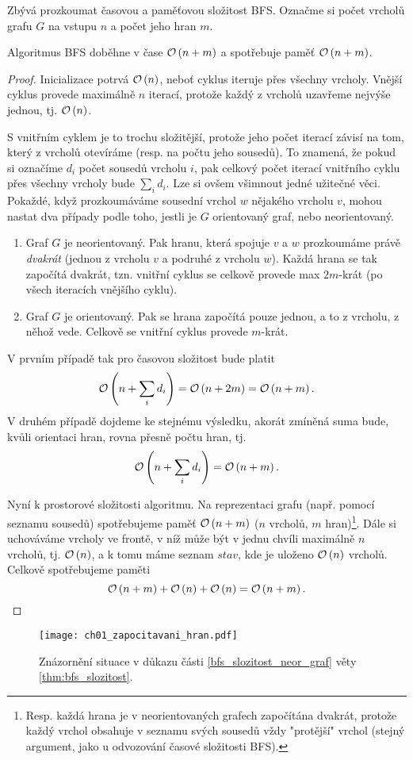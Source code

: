 Zbývá prozkoumat časovou a paměťovou složitost BFS. Označme si počet vrcholů grafu $G$ na vstupu $n$ a počet jeho hran $m$. 
\begin{theorem}\label{thm:bfs_slozitost}
    Algoritmus BFS doběhne v čase $\mathcal{O}\left(n+m\right)$ a spotřebuje paměť $\mathcal{O}\left(n+m\right)$.
\end{theorem}
\begin{proof}
    Inicializace potrvá $\mathcal{O}\left(n\right)$, neboť cyklus iteruje přes všechny vrcholy. Vnější cyklus provede maximálně $n$ iterací, protože každý z vrcholů uzavřeme nejvýše jednou, tj. $\mathcal{O}\left(n\right)$.

    S vnitřním cyklem je to trochu složitější, protože jeho počet iterací závisí na tom, který z vrcholů otevíráme (resp. na počtu jeho sousedů). To znamená, že pokud si označíme $d_i$ počet sousedů vrcholu $i$, pak celkový počet iterací vnitřního cyklu přes všechny vrcholy bude $\sum_i{d_i}$. Lze si ovšem všimnout jedné užitečné věci. Pokaždé, když prozkoumáváme sousední vrchol $w$ nějakého vrcholu $v$, mohou nastat dva případy podle toho, jestli je $G$ orientovaný graf, nebo neorientovaný.
    \begin{enumerate}[label=(\roman*)]
        \item\label{bfs_slozitost_neor_graf} Graf $G$ je neorientovaný. Pak hranu, která spojuje $v$ a $w$ prozkoumáme právě \emph{dvakrát} (jednou z vrcholu $v$ a podruhé z vrcholu $w$). Každá hrana se tak započítá dvakrát, tzn. vnitřní cyklus se celkově provede max $2m$-krát (po všech iteracích vnějšího cyklu).
        \item\label{bfs_slozitost_or_graf} Graf $G$ je orientovaný. Pak se hrana započítá pouze jednou, a to z vrcholu, z něhož vede. Celkově se vnitřní cyklus provede $m$-krát.
    \end{enumerate}
    V prvním případě tak pro časovou složitost bude platit
    \[\mathcal{O}\left(n+\sum_i{d_i}\right)=\mathcal{O}\left(n+2m\right)=\mathcal{O}\left(n+m\right).\]
    V druhém případě dojdeme ke stejnému výsledku, akorát zmíněná suma bude, kvůli orientaci hran, rovna přesně počtu hran, tj.
    \[\mathcal{O}\left(n+\sum_i{d_i}\right)=\mathcal{O}\left(n+m\right).\]

    Nyní k prostorové složitosti algoritmu. Na reprezentaci grafu (např. pomocí seznamu sousedů) spotřebujeme paměť $\mathcal{O}\left(n+m\right)$ ($n$ vrcholů, $m$ hran)\footnote{Resp. každá hrana je v neorientovaných grafech započítána dvakrát, protože každý vrchol obsahuje v seznamu svých sousedů vždy "protější" vrchol (stejný argument, jako u odvozování časové složitosti BFS).}. Dále si uchováváme vrcholy ve frontě, v níž může být v jednu chvíli maximálně $n$ vrcholů, tj. $\mathcal{O}\left(n\right)$, a k tomu máme seznam $stav$, kde je uloženo $\mathcal{O}\left(n\right)$ vrcholů. Celkově spotřebujeme paměti
    \[\mathcal{O}\left(n+m\right)+\mathcal{O}\left(n\right)+\mathcal{O}\left(n\right)=\mathcal{O}\left(n+m\right).\]

\end{proof}
\begin{figure}[h]
    \centering
    \texttt{[image: ch01\_zapocitavani\_hran.pdf]}
    \caption{Znázornění situace v důkazu části \ref{bfs_slozitost_neor_graf} věty \ref{thm:bfs_slozitost}.}
\end{figure}
